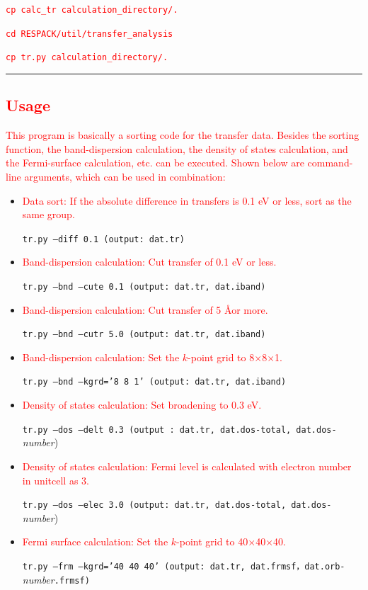 \documentclass{article}
\newcommand{\tr}[1]{\textcolor{red}{#1}}
\begin{document}
\tr{\texttt{cp calc\_tr calculation\_directory/.}}

\tr{\texttt{cd RESPACK/util/transfer\_analysis}}

\tr{\texttt{cp tr.py calculation\_directory/.}}

\vspace{3mm}\hrule\vspace{3mm} 


\subsection{\label{how-to-trpy}\tr{Usage}}
\tr{This program is basically a sorting code for the transfer data. Besides the sorting function, the band-dispersion calculation, the density of states calculation, and the Fermi-surface calculation, etc. can be executed. Shown below are command-line arguments, which can be used in combination:} 
\begin{itemize}
\item \tr{Data sort: If the absolute difference in transfers is 0.1 eV or less, sort as the same group.}

{\tt tr.py --diff 0.1  (output: dat.tr)} 

\item \tr{Band-dispersion calculation: Cut transfer of 0.1 eV or less.}

{\tt tr.py --bnd --cute 0.1 (output: dat.tr, dat.iband)} 

\item \tr{Band-dispersion calculation: Cut transfer of 5 \AA or more.}

{\tt tr.py --bnd --cutr 5.0 (output: dat.tr, dat.iband)}

\item \tr{Band-dispersion calculation: Set the $k$-point grid to 8$\times$8$\times$1.}

{\tt tr.py --bnd --kgrd='8 8 1' (output: dat.tr, dat.iband)}

\item \tr{Density of states calculation: Set broadening to 0.3 eV.}

{\tt tr.py --dos --delt 0.3 (output : dat.tr, dat.dos-total, dat.dos-}{\it number})

\item \tr{Density of states calculation: Fermi level is calculated with electron number in unitcell as 3.}

{\tt tr.py --dos --elec 3.0 (output: dat.tr, dat.dos-total, dat.dos-}{\it number})

\item \tr{Fermi surface calculation: Set the $k$-point grid to 40$\times$40$\times$40.}

{\tt tr.py --frm --kgrd='40 40 40' (output: dat.tr, dat.frmsf，dat.orb-}{\it number}{\tt .frmsf)} 
\end{itemize}
\end{document}
